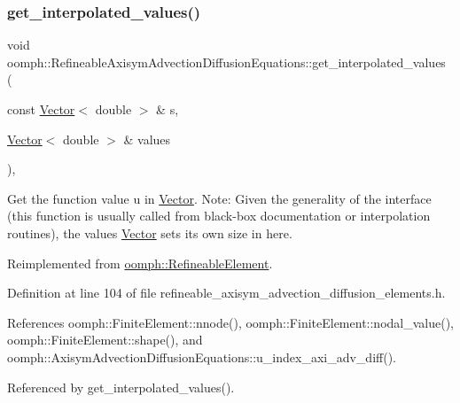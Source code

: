 \subsubsection{\texorpdfstring{get\+\_\+interpolated\+\_\+values()}{get\_interpolated\_values()}\hspace{0.1cm}{\footnotesize\ttfamily [1/2]}}
{\footnotesize\ttfamily void oomph\+::\+Refineable\+Axisym\+Advection\+Diffusion\+Equations\+::get\+\_\+interpolated\+\_\+values (\begin{DoxyParamCaption}\item[{const \hyperlink{classoomph_1_1Vector}{Vector}$<$ double $>$ \&}]{s,  }\item[{\hyperlink{classoomph_1_1Vector}{Vector}$<$ double $>$ \&}]{values }\end{DoxyParamCaption})\hspace{0.3cm}{\ttfamily [inline]}, {\ttfamily [virtual]}}



Get the function value u in \hyperlink{classoomph_1_1Vector}{Vector}. Note\+: Given the generality of the interface (this function is usually called from black-\/box documentation or interpolation routines), the values \hyperlink{classoomph_1_1Vector}{Vector} sets its own size in here. 



Reimplemented from \hyperlink{classoomph_1_1RefineableElement_ad9a4f92880668a2373326d8306365c43}{oomph\+::\+Refineable\+Element}.



Definition at line 104 of file refineable\+\_\+axisym\+\_\+advection\+\_\+diffusion\+\_\+elements.\+h.



References oomph\+::\+Finite\+Element\+::nnode(), oomph\+::\+Finite\+Element\+::nodal\+\_\+value(), oomph\+::\+Finite\+Element\+::shape(), and oomph\+::\+Axisym\+Advection\+Diffusion\+Equations\+::u\+\_\+index\+\_\+axi\+\_\+adv\+\_\+diff().



Referenced by get\+\_\+interpolated\+\_\+values().

\mbox{\label{classoomph_1_1RefineableAxisymAdvectionDiffusionEquations_abacbd89407f04f0e98ce22cabbe43930}} 
